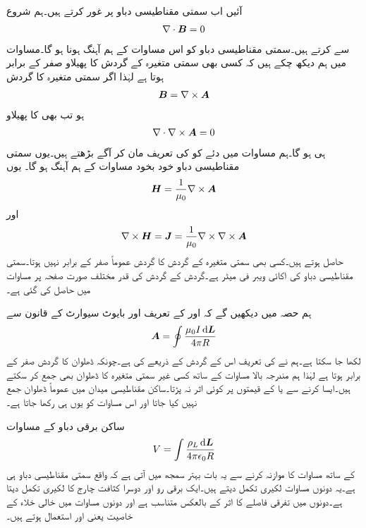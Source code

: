 آئیں اب سمتی مقناطیسی دباو پر غور کرتے ہیں۔ہم شروع
\begin{align}\label{مساوات_مقناطیسی_پھیلاو_بہاو_صفر_ہے}
\nabla \cdot {\ensuremath{{\boldsymbol{B}}}}=0
\end{align}
سے کرتے ہیں۔سمتی مقناطیسی دباو کو اس مساوات کے ہم آہنگ ہونا ہو گا۔مساوات  میں ہم دیکھ چکے ہیں کہ کسی بھی سمتی متغیرہ کے گردش کا پھیلاو صفر کے برابر ہوتا ہے لہٰذا اگر  سمتی متغیرہ  کا گردش
\begin{align}\label{مساوات_مقناطیسی_سمتی_دباو_تعریف}
{\ensuremath{{\boldsymbol{B}}}}=\nabla \times {\ensuremath{{\boldsymbol{A}}}}
\end{align}
 ہو تب بھی  کا پھیلاو
\begin{align*}
\nabla \cdot \nabla \times {\ensuremath{{\boldsymbol{A}}}}=0
\end{align*}
ہی ہو گا۔ہم مساوات  میں دئے  کو  کی تعریف مان کر آگے بڑھتے ہیں۔یوں سمتی مقناطیسی دباو خود بخود مساوات  کے ہم آہنگ ہو گا۔  یوں
\begin{align*}
{\ensuremath{{\boldsymbol{H}}}}=\frac{1}{\mu_0} \nabla \times {\ensuremath{{\boldsymbol{A}}}}
\end{align*}
اور
\begin{align*}
\nabla \times {\ensuremath{{\boldsymbol{H}}}}={{\boldsymbol{J}}}=\frac{1}{\mu_0} \nabla \times \nabla \times {\ensuremath{{\boldsymbol{A}}}}
\end{align*}
حاصل ہوتے ہیں۔کسی بھی سمتی متغیرہ کے گردش کا گردش عموماً صفر کے برابر نہیں ہوتا۔سمتی مقناطیسی دباو  کی اکائی ویبر فی میٹر  ہے۔گردش کے گردش کی قدر مختلف صورت صفحہ  پر مساوات  میں حاصل کی گئی ہے۔

ہم حصہ  میں دیکھیں گے کہ  اور  کے تعریف اور بایوٹ سیوارٹ کے قانون سے
\begin{align}\label{مساوات_مقناطیسی_سمتی_دباو}
\kvec{A}=\oint \frac{\mu_0 I \dif \kvec{L}}{4\pi R}
\end{align}
لکھا جا سکتا ہے۔ہم نے  کی تعریف اس کے گردش کے ذریعے کی ہے۔چونکہ ڈھلوان کا گردش صفر کے برابر ہوتا ہے  لہٰذا ہم مندرجہ بالا مساوات کے ساتھ کسی غیر سمتی متغیرہ کا ڈھلوان بھی جمع کر سکتے ہیں۔ایسا کرنے سے  یا  کے قیمتوں پر کوئی اثر نہ پڑتا۔ساکن مقناطیسی میدان میں عموماً ڈھلوان جمع نہیں کیا جاتا اور اس مساوات کو یوں ہی رکھا جاتا ہے۔

ساکن برقی دباو کے مساوات
\begin{align*}
V=\int \frac{\rho_L \dif \kvec{L}}{4\pi \epsilon_0 R}
\end{align*}
کے ساتھ مساوات کا موازنہ کرنے سے یہ بات بہتر سمجھ میں آتی ہے کہ  واقع سمتی مقناطیسی دباو ہی ہے۔یہ دونوں مساوات لکیری تکمل دیتے ہیں۔ایک برقی رو اور دوسرا کثافت چارج کا لکیری تکمل دیتا ہے۔دونوں میں تفرقی فاصلے  کا اثر  کے بالعکس متناسب ہے اور دونوں مساوات میں خالی خلاء کے خاصیت یعنی  اور  استعمال ہوتے ہیں۔

